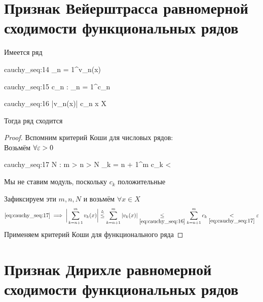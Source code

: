 \section{Признак Вейерштрасса равномерной сходимости функциональных рядов}

\begin{theorem}
	Имеется ряд
	\begin{equ}{cauchy_seq:14}
		\sum_{n = 1}^\infty v_n(x)
	\end{equ}
	\begin{equ}{cauchy_seq:15}
		\exist c_n : \quad \sum_{n = 1}^\infty c_n 
	\end{equ}
	\begin{equ}{cauchy_seq:16}
		|v_n(x)| \le c_n \quad \forall x \in X
	\end{equ}
	Тогда ряд  сходится 
\end{theorem}

\begin{proof}
	Вспомним критерий Коши для числовых рядов: \\
	Возьмём $ \forall \varepsilon > 0 $
	\begin{equ}{cauchy_seq:17}
		 \implies \exist N : \quad \forall m > n > N \quad \sum_{k = n + 1}^m c_k < \veps
	\end{equ}
	\begin{note}
		Мы не ставим модуль, поскольку $ c_k $ положительные
	\end{note}
	Зафиксируем эти $ m, n, N $ и возьмём $ \forall x \in X $
	$$ \eref{cauchy_seq:17} \implies \bigg| \sum_{k = n + 1}^m v_k(x) \bigg| \trile \sum_{k = n + 1}^m |v_k(x)|\underset{\eref{cauchy_seq:16}}\le \sum_{k = n + 1}^m c_k \underset{\eref{cauchy_seq:17}}< \veps $$
	Применяем критерий Коши для функционального ряда
\end{proof}

\section{Признак Дирихле равномерной сходимости функциональных рядов}

